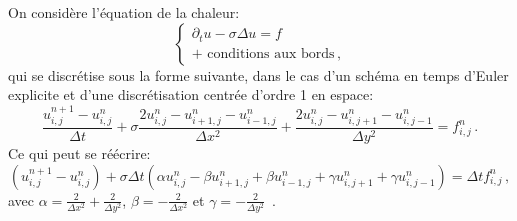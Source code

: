 \documentclass[11pt]{article}
\begin{document}
On considère l'équation de la chaleur: 
\begin{equation}
	\left\{
	\begin{array}{l}
		\partial_t u - \sigma \Delta u = f\\
		\textrm{+ conditions aux bords} \,,	
	\end{array}
	\right.
\label{eq:heat}
\end{equation}
qui se discrétise sous la forme suivante, dans le cas d'un schéma en temps d'Euler explicite et d'une discrétisation centrée d'ordre 1 en espace:
\begin{equation}
  \frac{u^{n+1}_{i,j}-u^{n}_{i,j}}{\Delta t} + \sigma \frac{2u^{n}_{i,j}-u^{n}_{i+1,j}-u^{n}_{i-1,j}}{\Delta x^2} + \frac{2u^{n}_{i,j} - u^{n}_{i,j+1} - u^{n}_{i,j-1}}{\Delta y^2} = f^{n}_{i,j} \,.
\label{eq:discrete}
\end{equation}
Ce qui peut se réécrire:
\begin{equation}
 (u^{n+1}_{i,j}-u^{n}_{i,j}) + \sigma\Delta t\left(\alpha u^{n}_{i,j} - \beta u^{n}_{i+1,j} +  \beta u^{n}_{i-1,j} + \gamma u^{n}_{i,j+1} +  \gamma u^{n}_{i,j-1}\right) = \Delta t f^{n}_{i,j} \,,
\label{eq:discrete2}
\end{equation}
avec $\alpha = \frac{2}{\Delta x^2} + \frac{2}{\Delta y^2}$, $\beta = -\frac{2}{\Delta x^2}$ et $\gamma = -\frac{2}{\Delta y^2}$ \,.

\bigskip
\end{document}
